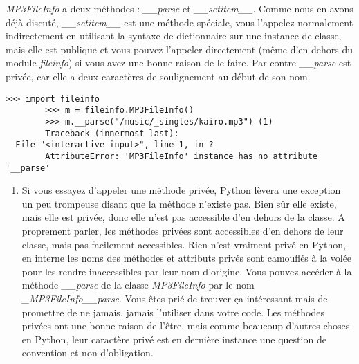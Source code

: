 \emph{MP3FileInfo} a deux méthodes : \emph{\_\_parse} et \emph{\_\_setitem\_\_}. Comme nous en avons déjà discuté, \emph{\_\_setitem\_\_} est une méthode spéciale, vous l'appelez normalement indirectement en utilisant la syntaxe de dictionnaire sur une instance de classe, mais elle est publique et vous pouvez l'appeler directement (même d'en dehors du module \emph{fileinfo}) si vous avez une bonne raison de le faire. Par contre \emph{\_\_parse} est privée, car elle a deux caractères de soulignement au début de son nom.


\begin{example}
\begin{lstlisting}
>>> import fileinfo
        >>> m = fileinfo.MP3FileInfo()
        >>> m.__parse("/music/_singles/kairo.mp3") (1)
        Traceback (innermost last):
  File "<interactive input>", line 1, in ?
        AttributeError: 'MP3FileInfo' instance has no attribute '__parse'
\end{lstlisting}
\end{example}

\begin{enumerate}
    \item Si vous essayez d'appeler une méthode privée, Python lèvera une exception un peu trompeuse disant que la méthode n'existe pas. Bien sûr elle existe, mais elle est privée, donc elle n'est pas accessible d'en dehors de la classe. A proprement parler, les méthodes privées sont accessibles d'en dehors de leur classe, mais pas facilement accessibles. Rien n'est vraiment privé en Python, en interne les noms des méthodes et attributs privés sont camouflés à la volée pour les rendre inaccessibles par leur nom d'origine. Vous pouvez accéder à la méthode \emph{\_\_parse} de la classe \emph{MP3FileInfo} par le nom \emph{\_MP3FileInfo\_\_parse}. Vous êtes prié de trouver ça intéressant mais de promettre de ne jamais, jamais l'utiliser dans votre code. Les méthodes privées ont une bonne raison de l'être, mais comme beaucoup d'autres choses en Python, leur caractère privé est en dernière instance une question de convention et non d'obligation.
\end{enumerate}

